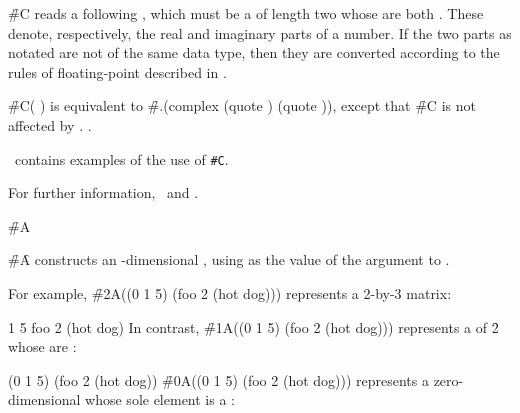 \f{\#C} reads a following , which must be a  of
length two whose  are both .
These  denote, respectively,
the real and imaginary parts of a  number.
If the two parts as notated are not of the same data type,
then they are converted 
according to the rules of floating-point 
described in \secref\NumericContagionRules.

\f{\#C( )} is equivalent to 
\f{\#.(complex (quote ) (quote ))},
except that \f{\#C} is not affected by .
.

\Thenextfigure\ contains examples of the use of {\tt \#C}.


For further information, 
\seesection\PrintingComplexes\ and \secref\SyntaxOfComplexes.

\endsubsubsection%


\f{\#A}

\f{\#\f{A}} constructs an -dimensional ,
using  as the value of the  argument
to .

For example, \f{\#2A((0 1 5) (foo 2 (hot dog)))} represents a 2-by-3 matrix:

       1       5
 foo     2       (hot dog)
\endcode
In contrast, \f{\#1A((0 1 5) (foo 2 (hot dog)))} 
represents a  of  \f{2} 
whose  are :

\code
 (0 1 5) (foo 2 (hot dog))
\endcode
\f{\#0A((0 1 5) (foo 2 (hot dog)))} represents a zero-dimensional
 whose sole element is a :

